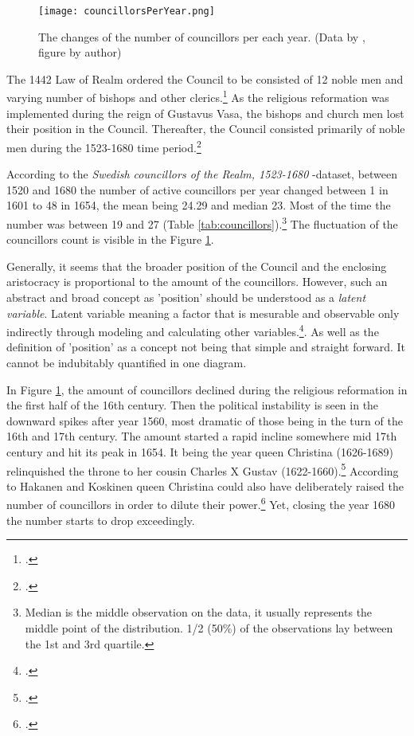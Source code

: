 \begin{figure}
	\texttt{[image: councillorsPerYear.png]}
	\centering
	\caption[The changes of the number of councillors per each year 1520-1680]{The changes of the number of councillors per each year. (Data by \cite{councillorsDS}, figure by author)} 
	\centering
	\label{fig:peryear}
\end{figure}

The 1442 Law of Realm ordered the Council to be consisted of 12 noble men and varying number of bishops and other clerics.\footcite[p. 49.]{HakanenAKoskinen2017} As the religious reformation was implemented during the reign of Gustavus Vasa, the bishops and church men lost their position in the Council. Thereafter, the Council consisted primarily of noble men during the 1523-1680 time period.\footcites[pp. 72-75,]{pSuurvalta}[p. 15]{agencyAndStateBuilding} 

According to the \textit{Swedish councillors of the Realm, 1523-1680} -dataset, between 1520 and 1680 the number of active councillors per year changed between 1 in 1601 to 48 in 1654, the mean being 24.29 and median 23. Most of the time the number was between 19 and 27 (Table \ref{tab:councillors}).\footnote{Median is the middle observation on the data, it usually represents the middle point of the distribution.\cites[p. 26,]{statisticsfor}[pp. 30-31.]{MooreEtAl} 1/2 (50\%) of the observations lay between the 1st and 3rd quartile.\cite[pp. 32-33.]{MooreEtAl}} The fluctuation of the councillors count is visible in the Figure \ref{fig:peryear}. 

Generally, it seems that the broader position of the Council and the enclosing aristocracy is proportional to the amount of the councillors. However, such an abstract and broad concept as 'position' should be understood as a \textit{latent variable}. Latent variable meaning a factor that is mesurable and observable only indirectly through modeling and calculating other variables.\footcite{apa}. As well as the definition of 'position' as a concept not being that simple and straight forward. It cannot be indubitably quantified in one diagram.

In Figure \ref{fig:peryear}, the amount of councillors declined during the religious reformation in the first half of the 16th century. Then the political instability is seen in the downward spikes after year 1560, most dramatic of those being in the turn of the 16th and 17th century. The amount started a rapid incline somewhere mid 17th century and hit its peak in 1654. It being the year queen Christina (1626-1689) relinquished the throne to her cousin Charles X Gustav (1622-1660).\footcite[pp. 8-9.]{personalAgency} According to Hakanen and Koskinen queen Christina could also have deliberately raised the number of councillors in order to dilute their power.\footcite[pp. 63-64.]{HakanenAKoskinen2017} Yet, closing the year 1680 the number starts to drop exceedingly.

